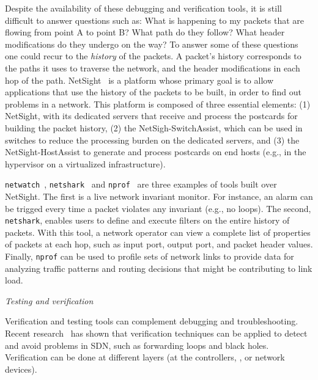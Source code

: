 Despite the availability of these debugging and verification tools, it is still difficult to answer questions such as: What is happening to my packets that are flowing from point A to point B? What path do they follow? What header modifications do they undergo on the way? 
To answer some of these questions one could recur to the \emph{history} of the packets. A packet's history corresponds 
to the paths it uses to traverse the network, and the header modifications in each hop of the path.
NetSight~\cite{handigol2014} is a platform whose primary goal is to allow applications that use the history of the packets to be built, in order to find out problems in a network.
This platform is composed of three essential elements: (1) NetSight, with its dedicated servers that receive and 
process the postcards for building the packet history, (2) the NetSigh-SwitchAssist, which can be used in 
switches to reduce the processing burden on the dedicated servers, and (3) the NetSight-HostAssist to generate 
and process postcards on end hosts (e.g., in the hypervisor on a virtualized infrastructure).

\texttt{netwatch}~\cite{handigol2014}, \texttt{netshark}~\cite{handigol2014} and \texttt{nprof}~\cite{handigol2014} are three examples of tools built over NetSight.
The first is a live network invariant monitor. 
For instance, an alarm can be trigged every time a packet violates any invariant (e.g., no loops).
The second, \texttt{netshark}, enables users to define and execute filters on the entire history of packets.
With this tool, a network operator can view a complete list of properties of packets at each hop, such as input port, output port, and packet header values.
Finally, \texttt{nprof} can be used to profile sets of network links to provide data for analyzing 
traffic patterns and routing decisions that might be contributing to link load.

\vspace{2mm}
\noindent \textit{Testing and verification}

Verification and testing tools can complement debugging and troubleshooting.
Recent research~\cite{khurshid2012,altekar2010,al-shaer2010,canini2012-1,kuzniar2012,ruchansky2013,zeng2014} 
has shown that verification techniques can be applied to detect and avoid problems in SDN, 
such as forwarding loops and black holes. Verification can be done at different layers (at the controllers, \manapps, or network devices).


